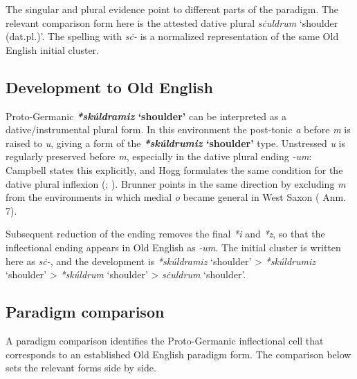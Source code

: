 \documentclass[
  british,
  a4paper,
  openany]{book}
\providecommand{\Recon}[1]{\emph{*#1}}
{\catcode`→=\active \global\def→{\ensuremath{\rightarrow}}}
\providecommand{\Recon}[1]{\emph{*#1}}
{\catcode`→=\active \global\def→{\ensuremath{\rightarrow}}}
\begin{document}
The singular and plural evidence point to different parts of the
paradigm. The relevant comparison form here is the attested dative
plural {\emph{sċuldrum}} `shoulder (dat.pl.)'. The spelling with
\emph{sċ-} is a normalized representation of the same Old English
initial cluster.

\subsection{Development to Old
English}\label{development-to-old-english-122}

Proto-Germanic \textbf{\Recon{skúldramiz} `shoulder'} can be interpreted
as a dative/instrumental plural form. In this environment the post-tonic
\emph{a} before \emph{m} is raised to \emph{u}, giving a form of the
\textbf{\Recon{skúldrumiz} `shoulder'} type. Unstressed \emph{u} is
regularly preserved before \emph{m}, especially in the dative plural
ending \emph{-um}: Campbell states this explicitly, and Hogg formulates
the same condition for the dative plural inflexion
(;
). Brunner points in
the same direction by excluding \emph{m} from the environments in which
medial \emph{o} became general in West Saxon
( Anm. 7).

Subsequent reduction of the ending removes the final \emph{*i} and
\emph{*z}, so that the inflectional ending appears in Old English as
\emph{-um}. The initial cluster is written here as \emph{sċ-}, and the
development is \Recon{skúldramiz} `shoulder' \textgreater{}
\Recon{skúldrumiz} `shoulder' \textgreater{} \Recon{skúldrum} `shoulder'
\textgreater{} {\emph{sċuldrum}} `shoulder'.

\subsection{Paradigm comparison}\label{paradigm-comparison-14}

A paradigm comparison identifies the Proto-Germanic inflectional cell
that corresponds to an established Old English paradigm form. The
comparison below sets the relevant forms side by side.
\end{document}
